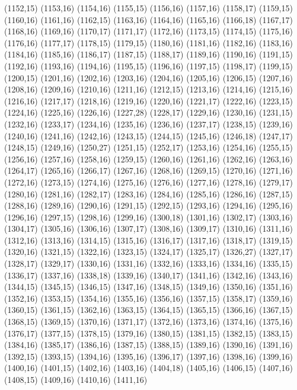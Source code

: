 (1152,15)
(1153,16)
(1154,16)
(1155,15)
(1156,16)
(1157,16)
(1158,17)
(1159,15)
(1160,16)
(1161,16)
(1162,15)
(1163,16)
(1164,16)
(1165,16)
(1166,18)
(1167,17)
(1168,16)
(1169,16)
(1170,17)
(1171,17)
(1172,16)
(1173,15)
(1174,15)
(1175,16)
(1176,16)
(1177,17)
(1178,15)
(1179,15)
(1180,16)
(1181,16)
(1182,16)
(1183,16)
(1184,16)
(1185,16)
(1186,17)
(1187,15)
(1188,17)
(1189,16)
(1190,16)
(1191,15)
(1192,16)
(1193,16)
(1194,16)
(1195,15)
(1196,16)
(1197,15)
(1198,17)
(1199,15)
(1200,15)
(1201,16)
(1202,16)
(1203,16)
(1204,16)
(1205,16)
(1206,15)
(1207,16)
(1208,16)
(1209,16)
(1210,16)
(1211,16)
(1212,15)
(1213,16)
(1214,16)
(1215,16)
(1216,16)
(1217,17)
(1218,16)
(1219,16)
(1220,16)
(1221,17)
(1222,16)
(1223,15)
(1224,16)
(1225,16)
(1226,16)
(1227,28)
(1228,17)
(1229,16)
(1230,16)
(1231,15)
(1232,16)
(1233,17)
(1234,16)
(1235,16)
(1236,16)
(1237,17)
(1238,15)
(1239,16)
(1240,16)
(1241,16)
(1242,16)
(1243,15)
(1244,15)
(1245,16)
(1246,18)
(1247,17)
(1248,15)
(1249,16)
(1250,27)
(1251,15)
(1252,17)
(1253,16)
(1254,16)
(1255,15)
(1256,16)
(1257,16)
(1258,16)
(1259,15)
(1260,16)
(1261,16)
(1262,16)
(1263,16)
(1264,17)
(1265,16)
(1266,17)
(1267,16)
(1268,16)
(1269,15)
(1270,16)
(1271,16)
(1272,16)
(1273,15)
(1274,16)
(1275,16)
(1276,16)
(1277,16)
(1278,16)
(1279,17)
(1280,16)
(1281,16)
(1282,17)
(1283,16)
(1284,16)
(1285,16)
(1286,16)
(1287,15)
(1288,16)
(1289,16)
(1290,16)
(1291,15)
(1292,15)
(1293,16)
(1294,16)
(1295,16)
(1296,16)
(1297,15)
(1298,16)
(1299,16)
(1300,18)
(1301,16)
(1302,17)
(1303,16)
(1304,17)
(1305,16)
(1306,16)
(1307,17)
(1308,16)
(1309,17)
(1310,16)
(1311,16)
(1312,16)
(1313,16)
(1314,15)
(1315,16)
(1316,17)
(1317,16)
(1318,17)
(1319,15)
(1320,16)
(1321,15)
(1322,16)
(1323,15)
(1324,17)
(1325,17)
(1326,27)
(1327,17)
(1328,17)
(1329,17)
(1330,16)
(1331,16)
(1332,16)
(1333,16)
(1334,16)
(1335,15)
(1336,17)
(1337,16)
(1338,18)
(1339,16)
(1340,17)
(1341,16)
(1342,16)
(1343,16)
(1344,15)
(1345,15)
(1346,15)
(1347,16)
(1348,15)
(1349,16)
(1350,16)
(1351,16)
(1352,16)
(1353,15)
(1354,16)
(1355,16)
(1356,16)
(1357,15)
(1358,17)
(1359,16)
(1360,15)
(1361,15)
(1362,16)
(1363,15)
(1364,15)
(1365,15)
(1366,16)
(1367,15)
(1368,15)
(1369,15)
(1370,16)
(1371,17)
(1372,16)
(1373,16)
(1374,16)
(1375,16)
(1376,17)
(1377,15)
(1378,15)
(1379,16)
(1380,15)
(1381,15)
(1382,15)
(1383,15)
(1384,16)
(1385,17)
(1386,16)
(1387,15)
(1388,15)
(1389,16)
(1390,16)
(1391,16)
(1392,15)
(1393,15)
(1394,16)
(1395,16)
(1396,17)
(1397,16)
(1398,16)
(1399,16)
(1400,16)
(1401,15)
(1402,16)
(1403,16)
(1404,18)
(1405,16)
(1406,15)
(1407,16)
(1408,15)
(1409,16)
(1410,16)
(1411,16)
